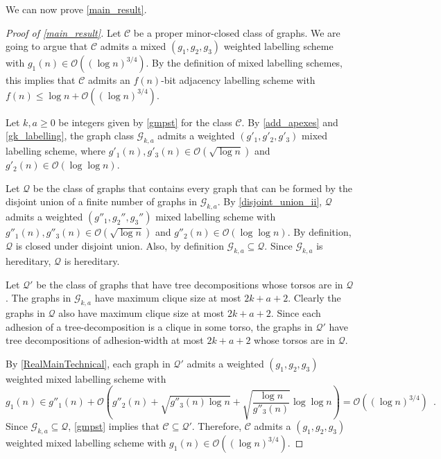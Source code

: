 \documentclass{patmorin}
\renewcommand{\ge}{\geqslant}
\renewcommand{\le}{\leqslant}
\renewcommand{\geq}{\geqslant}
\newcommand{\Oh}{\calO}
\newcommand{\calC}{\mathcal{C}}
\newcommand{\calG}{\mathcal{G}}
\newcommand{\calO}{\mathcal{O}}
\newcommand{\calQ}{\mathcal{Q}}
\begin{document}


  We can now prove \cref{main_result}.

  \begin{proof}[Proof of \cref{main_result}]
     Let $\calC$ be a proper minor-closed class of graphs.
     We are going to argue that $\calC$ admits a mixed $(g_1,g_2,g_3)$ weighted labelling scheme with $g_1(n) \in \Oh((\log n)^{3/4})$. By the definition of mixed labelling schemes, this implies that $\calC$ admits an $f(n)$-bit adjacency labelling scheme with $f(n)\le\log n + \Oh((\log n)^{3/4})$.

     Let $k,a\geq 0$ be integers given by \cref{gmpst} for the class $\calC$.
     By \cref{add_apexes} and \cref{gk_labelling}, the graph class $\calG_{k,a}$ admits a weighted $(g'_1,g'_2,g'_3)$ mixed labelling scheme, where $g'_1(n),g'_3(n)\in \Oh(\sqrt{\log n})$ and $g'_2(n)\in \Oh(\log\log n)$.

     Let $\calQ$ be the class of graphs that contains every graph that can be formed by the disjoint union of a finite number of graphs in $\calG_{k,a}$.  By \cref{disjoint_union_ii}, $\calQ$ admits a weighted $(g''_1,g_2'',g_3'')$ mixed labelling scheme with $g''_1(n),g''_3(n)\in \Oh(\sqrt{\log n})$ and $g''_2(n)\in \Oh(\log\log n)$.   By definition, $\calQ$ is closed under disjoint union.  Also, by definition $\calG_{k,a}\subseteq\calQ$. Since $\calG_{k,a}$ is hereditary, $\calQ$ is hereditary.

     Let $\calQ'$ be the class of graphs that have tree decompositions whose torsos are in $\calQ$.  The graphs in $\calG_{k,a}$ have maximum clique size at most $2k+a+2$.  Clearly the graphs in $\calQ$ also have maximum clique size at most $2k+a+2$. Since each adhesion of a tree-decomposition is a clique in some torso, the graphs in $\calQ'$ have tree decompositions of adhesion-width at most $2k+a+2$ whose torsos are in $\calQ$.

     By \cref{RealMainTechnical}, each graph in $\calQ'$ admits a weighted $(g_1,g_2,g_3)$ weighted mixed labelling scheme with
     \[
       g_1(n) \in g''_1(n) + \Oh\left(g''_2(n) + \sqrt{g''_3(n)\log n}
       + \sqrt{\frac{\log n}{g''_3(n)}}\log\log n\right) = \Oh((\log n)^{3/4}) \enspace.
     \]
     Since $\calG_{k,a}\subseteq\calQ$, \cref{gmpst} implies that $\calC\subseteq\calQ'$.  Therefore, $\calC$ admits a $(g_1,g_2,g_3)$ weighted mixed labelling scheme with $g_1(n)\in \Oh((\log n)^{3/4})$.
  \end{proof}
\end{document}

